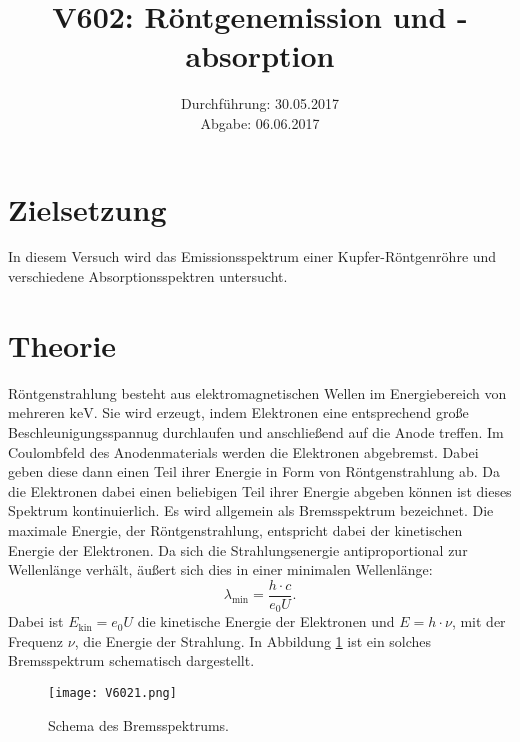 \documentclass[
  bibliography=totoc,     %
  captions=tableheading,  %
  titlepage=firstiscover, %
]{scrartcl}
\title{V602: Röntgenemission und -absorption}
\author{
  Simon Schulte
  \texorpdfstring{
    \\
    \href{mailto:simon.schulte@udo.edu}{simon.schulte@udo.edu}
  }{}
  \texorpdfstring{\and}{, }
  Tim Sedlaczek
  \texorpdfstring{
    \\
    \href{mailto:tim.sedlaczek@udo.edu}{tim.sedlaczek@udo.edu}
  }{}
}
\date{Durchführung: 30.05.2017\\
      Abgabe: 06.06.2017}
\begin{document}
\maketitle
\thispagestyle{empty}
\tableofcontents
\newpage
\setcounter{page}{1}
\section{Zielsetzung}
\label{sec:zielsetzung}
In diesem Versuch wird das Emissionsspektrum einer Kupfer-Röntgenröhre
und verschiedene Absorptionsspektren untersucht.
\section{Theorie}
\label{sec:theorie}
Röntgenstrahlung besteht aus elektromagnetischen Wellen im Energiebereich von
mehreren $\si{\kilo\electronvolt}$. Sie wird erzeugt, indem Elektronen eine
entsprechend große Beschleunigungsspannug durchlaufen und anschließend auf die
Anode treffen. Im Coulombfeld des Anodenmaterials werden die Elektronen
abgebremst. Dabei geben diese dann einen Teil ihrer Energie in Form von
Röntgenstrahlung ab. Da die Elektronen dabei einen beliebigen Teil ihrer Energie
abgeben können ist dieses Spektrum kontinuierlich. Es wird allgemein als
Bremsspektrum bezeichnet. Die maximale Energie, der Röntgenstrahlung, entspricht
dabei der kinetischen Energie der Elektronen. Da sich die Strahlungsenergie
antiproportional zur Wellenlänge verhält, äußert sich dies in einer minimalen
Wellenlänge:
\begin{equation}
  \lambda_\mathup{min} = \frac{h \cdot c}{e_0 U}.
  \label{eqn:minlam}
\end{equation}
Dabei ist $E_\mathup{kin} = e_0 U$ die kinetische Energie der Elektronen und
$E = h \cdot \nu$, mit der Frequenz $\nu$, die Energie der Strahlung.
In Abbildung \ref{fig:V6021} ist ein solches Bremsspektrum schematisch
dargestellt.
\begin{figure}[htb]
  \centering
  \texttt{[image: V6021.png]}
  \caption{Schema des Bremsspektrums. \cite{anleitung}}
  \label{fig:V6021}
\end{figure}
\end{document}

